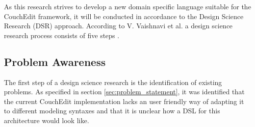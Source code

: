 \documentclass[10pt,a4paper,oneside]{scrartcl}
\begin{document}







As this research strives to develop a new domain specific language suitable for the CouchEdit framework, it will be conducted in accordance to the Design Science Research (DSR) approach. According to V. Vaishnavi et al. a design science research process consists of five steps \cite{Vaishnavi2004}.

\subsection{Problem Awareness}
The first step of a design science research is the identification of existing problems. As specified in section \ref{sec:problem_statement}, it was identified that the current CouchEdit implementation lacks an user friendly way of adapting it to different modeling syntaxes and that it is unclear how a DSL for this architecture would look like.
\end{document}
